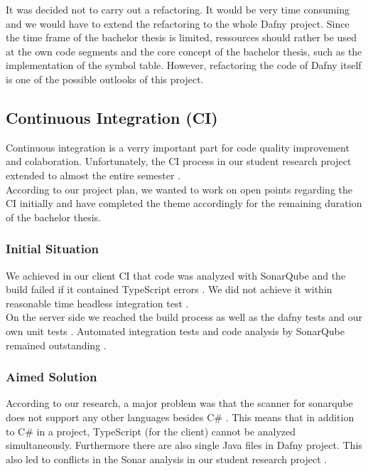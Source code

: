It was decided not to carry out a refactoring. It would be very time consuming and we would have to extend the refactoring to the whole Dafny project. Since the time frame of the bachelor thesis is limited, ressources should rather be used at the own code segments and the core concept of the bachelor thesis, such as the implementation of the symbol table. However, refactoring the code of Dafny itself is one of the possible outlooks of this project.






\subsection{Continuous Integration (CI)}
Continuous integration is a verry important part for code quality improvement and colaboration.
Unfortunately, the CI process in our student research project extended to almost the entire semester \cite{sa}. \\

According to our project plan, we wanted to work on open points regarding the CI initially and have completed the theme accordingly for the remaining duration of the bachelor thesis.

\subsubsection{Initial Situation}
We achieved in our client CI that code was analyzed with SonarQube and the build failed if it contained TypeScript errors \cite{sa}.
We did not achieve it within reasonable time headless integration test \cite{sa}. \\

On the server side we reached the build process as well as the dafny tests and our own unit tests \cite{sa}.
Automated integration tests and code analysis by SonarQube remained outstanding \cite{sa}.

\subsubsection{Aimed Solution}
According to our research, a major problem was that the scanner for sonarqube does not support any other languages besides C\# \cite{sonar-supports-only-one-language}.
This means that in addition to C\# in a project, TypeScript (for the client) cannot be analyzed simultaneously.
Furthermore there are also single Java files in Dafny project.
This also led to conflicts in the Sonar analysis in our student research project \cite{sa}. \\

